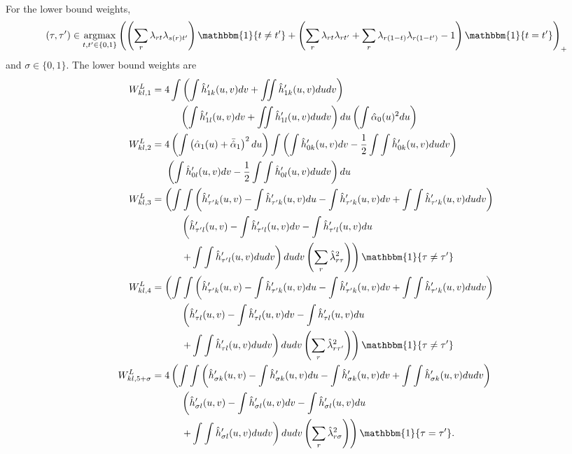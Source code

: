 \documentclass[12pt]{article}
\theoremstyle{definition}
\newcommand{\argmax}{\operatornamewithlimits{argmax}}
\begin{document}
{\begin{align*}
\end{align*}
For the lower bound weights,  \[(\tau, \tau') \in \argmax_{t,t' \in \{0,1\}}\left(\left(\sum_r {\lambda}_{rt}{\lambda}_{s(r)t'}\right)\mathbbm{1}\{t \neq t'\} + \left(\sum_r {\lambda}_{rt}{\lambda}_{rt'} + \sum_r {\lambda}_{r(1-t)}{\lambda}_{r(1-t')} - 1 \right)\mathbbm{1}\{t = t'\}\right)_{+}\] and $\sigma \in \{0,1\}$. The lower bound weights are  
\begin{align*}
W^{L}_{kl,1} &= 4\int \left(\int \hat{h}'_{1 k}(u,v)dv + \iint \hat{h}'_{1 k}(u,v)dudv\right) \\
&\hspace{10mm}\left(\int \hat{h}'_{1l}(u,v)dv + \iint \hat{h}'_{1l}(u,v)dudv\right)du \left(\int \hat{\alpha}_0(u)^{2}du\right) \\
W^{L}_{kl,2} &= 4\left( \int \left( \hat{\alpha}_1(u) + \bar{\hat{\alpha}}_1\right)^2du\right) \int \left(\int \hat{h}'_{0k}(u,v)dv - \frac{1}{2}\int\int \hat{h}'_{0k}(u,v)dudv\right)\\
&\hspace{5mm} \left(\int \hat{h}'_{0l}(u,v)dv - \frac{1}{2}\int\int \hat{h}'_{0l}(u,v)dudv\right)du\\
W^{L}_{kl,3} &= \left(\int\int\left(\hat{h}'_{\tau'k}(u,v) - \int\hat{h}'_{\tau'k}(u,v)du - \int\hat{h}'_{\tau'k}(u,v)dv + \int\int\hat{h}'_{\tau' k}(u,v)dudv\right)\right. \\
&\hspace{10mm}\left.\left(\hat{h}'_{\tau' l}(u,v) - \int\hat{h}'_{\tau'l}(u,v)dv - \int\hat{h}'_{\tau' l}(u,v)du\right.\right.\\
&\hspace{10mm}\left.\left.+ \int\int\hat{h}'_{\tau' l}(u,v)dudv\right)dudv \left(\sum_{r} \hat{\lambda}_{r\tau}^{2}\right)\right)\mathbbm{1}\{\tau \neq \tau'\} \\
W^{L}_{kl,4} &= \left(\int\int\left(\hat{h}'_{\tau'k}(u,v) - \int\hat{h}'_{\tau'k}(u,v)du - \int\hat{h}'_{\tau'k}(u,v)dv + \int\int\hat{h}'_{\tau'k}(u,v)dudv\right)\right. \\
&\hspace{10mm}\left.\left(\hat{h}'_{\tau l}(u,v) - \int\hat{h}'_{\tau l}(u,v)dv - \int\hat{h}'_{\tau l}(u,v)du\right.\right.\\
&\hspace{10mm}\left.\left.+ \int\int\hat{h}'_{\tau l}(u,v)dudv\right)dudv \left(\sum_{r} \hat{\lambda}_{r\tau'}^{2}\right)\right)\mathbbm{1}\{\tau \neq \tau'\} \\
W^{L}_{kl,5+\sigma} &= 4\left(\int\int\left(\hat{h}'_{\sigma k}(u,v) - \int\hat{h}'_{\sigma k}(u,v)du  - \int\hat{h}'_{\sigma k}(u,v)dv + \int\int\hat{h}'_{\sigma k}(u,v)dudv\right)\right.\\
&\hspace{10mm}\left.\left(\hat{h}'_{\sigma l}(u,v) - \int\hat{h}'_{\sigma l}(u,v)dv - \int\hat{h}'_{\sigma l}(u,v)du \right.\right. \\
&\hspace{10mm}\left.\left.+ \int\int\hat{h}'_{\sigma l}(u,v)dudv\right)dudv \left(\sum_{r} \hat{\lambda}_{r\sigma}^{2}\right)\right)\mathbbm{1}\{\tau = \tau'\}.
\end{align*}


}
\end{document}
